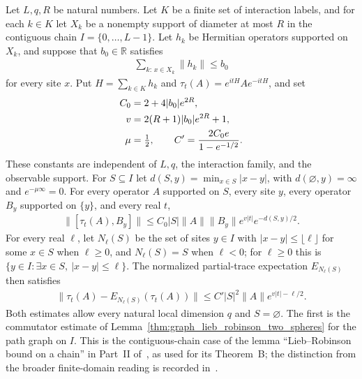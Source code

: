 \begin{lemma}
    \label{thm:chain_lieb_robinson}
    \leanok
    Let $L,q,R$ be natural numbers. Let $K$ be a finite set of interaction
    labels, and for each $k\in K$ let $X_k$ be a nonempty support of diameter
    at most $R$ in the contiguous chain $I=\{0,\ldots,L-1\}$.
    Let $h_k$ be Hermitian operators supported on $X_k$, and suppose that
    $b_0\in\mathbb R$ satisfies
    \begin{align}
        \sum_{k:\,x\in X_k}\|h_k\|\le b_0
    \end{align}
    for every site $x$. Put $H=\sum_{k\in K}h_k$ and
    $\tau_t(A)=e^{itH}Ae^{-itH}$, and set
    \begin{align}
        C_0 & =2+4|b_0|e^{2R},\notag      \\
        v   & =2(R+1)|b_0|e^{2R}+1,\notag \\
        \mu & =\tfrac12,\qquad
        C'=\frac{2C_0e}{1-e^{-1/2}}.\notag
    \end{align}
    These constants are independent of $L,q$, the interaction family, and
    the observable support. For $S\subseteq I$ let
    $d(S,y)=\min_{x\in S}|x-y|$, with $d(\varnothing,y)=\infty$ and
    $e^{-\mu\infty}=0$. For every operator $A$ supported on $S$, every site
    $y$, every operator $B_y$ supported on $\{y\}$, and every real $t$,
    \begin{align}
        \|[\tau_t(A),B_y]\|
        \le C_0|S|\|A\|\|B_y\|e^{v|t|}e^{-d(S,y)/2}.
    \end{align}
    For every real $\ell$, let $N_\ell(S)$ be the set of sites $y\in I$ with
    $|x-y|\le\lfloor\ell\rfloor$ for some $x\in S$ when $\ell\ge0$, and
    $N_\ell(S)=S$ when $\ell<0$; for $\ell\ge0$ this is
    $\{y\in I:\exists x\in S,\ |x-y|\le\ell\}$.
    The normalized partial-trace expectation $E_{N_\ell(S)}$ then satisfies
    \begin{align}
        \|\tau_t(A)-E_{N_\ell(S)}(\tau_t(A))\|
        \le C'|S|^2\|A\|e^{v|t|-\ell/2}.
    \end{align}
    Both estimates allow every natural local dimension $q$ and $S=\varnothing$.
    The first is the commutator estimate of
    Lemma~\ref{thm:graph_lieb_robinson_two_spheres} for the path graph on $I$.
    This is the contiguous-chain case
    of the lemma ``Lieb--Robinson bound on a chain'' in Part~II
    of~\cite{TNLean2026OneDimensional}, as used for its Theorem~B;
    the distinction from the broader finite-domain reading is recorded
    in~\cite{gap:tnlean_one_dimensional_connected_domain_scope}.
\end{lemma}
